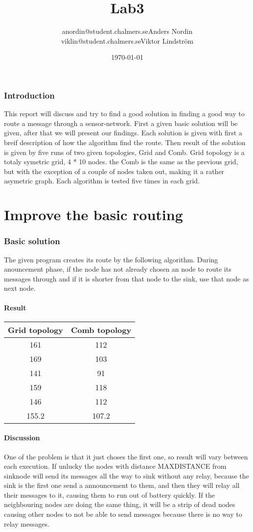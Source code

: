 \documentclass{article}
\title{Lab3}
\author{anordin@student.chalmers.se\quad Anders Nordin\\
        viklin@student.chalmers.se\quad Viktor Lindstr\"{o}m}
\date{\today}
\begin{document}
\maketitle
\newpage

\section{Introduction}
  This report will discuss and try to find a good solution in finding a 
  good way to route a message through a sensor-network.
  First a given basic solution will be given, after that
  we will present our findings. Each solution is given with first
  a breif description of how the algorithm find the route. Then 
  result of the solution is given by five runs of two given topologies,
  Grid and Comb. Grid topology is a totaly symetric grid, 4 * 10 nodes.
  the Comb is the same as the previous grid, but with the exception of
  a couple of nodes taken out, making it a rather asymetric graph.
  Each algorithm is tested five times in each grid.
\part{Improve the basic routing}
\section{Basic solution}
  The given program creates its route by the following algorithm.
  During anouncement phase, if the node has not already chosen an 
  node to route its messages through and if it is shorter
  from that node to the sink, use that node as next node.
  \subsection{Result}
    \begin{tabular}{c|c}
      Grid topology & Comb topology\\
      \hline
      \hline
      161 & 112\\
      169 & 103\\
      141 & 91\\
      159 & 118\\
      146 & 112\\
      \hline
      155.2&107.2\\
    \end{tabular}

  \subsection{Discussion}
    One of the problem is that it just choses the first one,
    so result will vary between each execution.
    If unlucky the nodes with distance MAXDISTANCE from
    sinknode will send its messages all the way to sink
    without any relay, because the sink is the first one
    send a announcement to them, and then they will relay
    all their messages to it, causing them to run out of 
    battery quickly. If the neighbouring nodes
    are doing the same thing, it will be a strip of dead
    nodes causing other nodes to not be able to send messages
    because there is no way to relay messages. 
\end{document}
